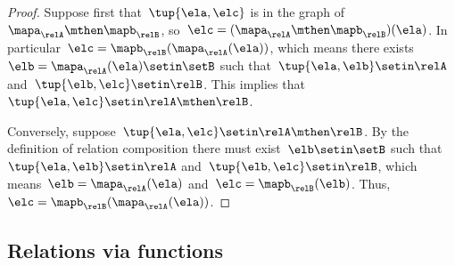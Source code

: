 \begin{proof}
    Suppose first that~$\tup{\ela, \elc}$ is in the graph of~$\mapa_{\relA} \mthen \mapb_{\relB}$, so~$\elc = (\mapa_{\relA} \mthen \mapb_{\relB})(\ela)$.
    In particular~$\elc = \mapb_{\relB}(\mapa_{\relA}(\ela))$, which means there exists~$\elb = \mapa_{\relA}(\ela) \setin \setB$ such that~$\tup{\ela, \elb} \setin \relA$ and~$\tup{\elb, \elc} \setin \relB$.
    This implies that~$\tup{\ela, \elc} \setin \relA \mthen \relB$.

    Conversely, suppose~$\tup{\ela, \elc} \setin \relA \mthen \relB$.
    By the definition of relation composition there must exist~$\elb \setin \setB$ such that~$\tup{\ela, \elb} \setin \relA$ and~$\tup{\elb, \elc} \setin \relB$, which means~$\elb = \mapa_{\relA}(\ela)$ and~$\elc = \mapb_{\relB}(\elb)$.
    Thus,~$\elc = \mapb_{\relB}(\mapa_{\relA}(\ela))$.
\end{proof}

\subsection{Relations via functions}

